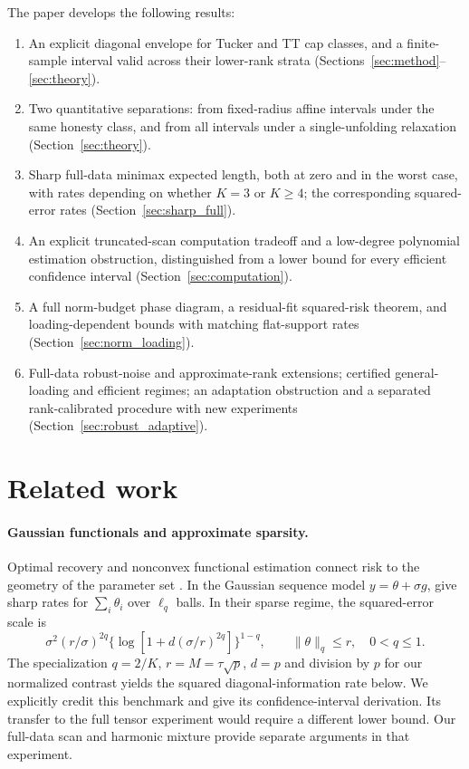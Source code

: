 \documentclass[11pt]{article}
\theoremstyle{remark}
\newcommand{\norm}[1]{\lVert #1\rVert}
\begin{document}
The paper develops the following results:
\begin{enumerate}
\item An explicit diagonal envelope for Tucker and TT cap classes, and a finite-sample interval valid across their lower-rank strata (Sections~\ref{sec:method}--\ref{sec:theory}).
\item Two quantitative separations: from fixed-radius affine intervals under the same honesty class, and from all intervals under a single-unfolding relaxation (Section~\ref{sec:theory}).
\item Sharp full-data minimax expected length, both at zero and in the worst case, with rates depending on whether $K=3$ or $K\ge4$; the corresponding squared-error rates (Section~\ref{sec:sharp_full}).
\item An explicit truncated-scan computation tradeoff and a low-degree polynomial estimation obstruction, distinguished from a lower bound for every efficient confidence interval (Section~\ref{sec:computation}).
\item A full norm-budget phase diagram, a residual-fit squared-risk theorem, and loading-dependent bounds with matching flat-support rates (Section~\ref{sec:norm_loading}).
\item Full-data robust-noise and approximate-rank extensions; certified general-loading and efficient regimes; an adaptation obstruction and a separated rank-calibrated procedure with new experiments (Section~\ref{sec:robust_adaptive}).
\end{enumerate}

\section{Related work}\label{sec:related}

\paragraph{Gaussian functionals and approximate sparsity.}
Optimal recovery and nonconvex functional estimation connect risk to the geometry of the parameter set \citep{donoho1994,cailownonconvex2004}. In the Gaussian sequence model $y=\theta+\sigma g$, \citet{collier2017} give sharp rates for $\sum_i\theta_i$ over $\ell_q$ balls. In their sparse regime, the squared-error scale is
\[
 \sigma^2(r/\sigma)^{2q}
 \{\log[1+d(\sigma/r)^{2q}]\}^{1-q},
 \qquad \norm\theta_q\le r,\quad 0<q\le1.
\]
The specialization $q=2/K$, $r=M=\tau\sqrt p$, $d=p$ and division by $p$ for our normalized contrast yields the squared diagonal-information rate below. We explicitly credit this benchmark and give its confidence-interval derivation. Its transfer to the full tensor experiment would require a different lower bound. Our full-data scan and harmonic mixture provide separate arguments in that experiment.
\end{document}
